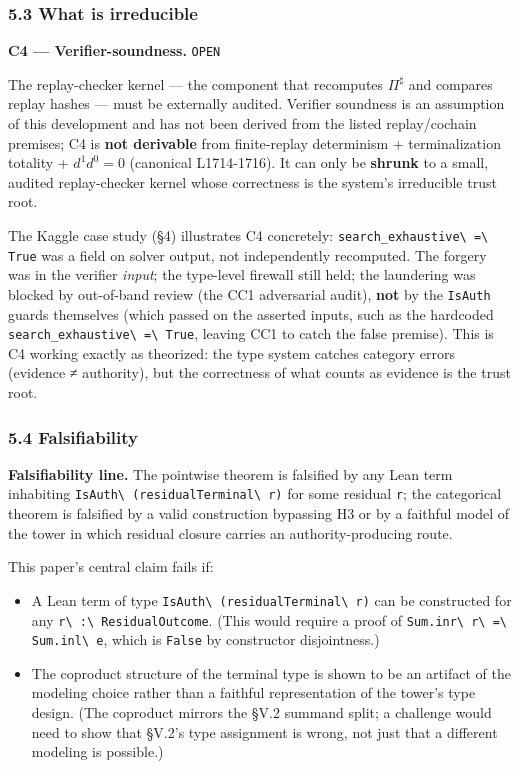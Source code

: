 \documentclass[
  10pt,
]{article}
\providecommand{\tightlist}{%
  \setlength{\itemsep}{0pt}\setlength{\parskip}{0pt}}
\providecommand{\tightlist}{%
  \setlength{\itemsep}{0pt}\setlength{\parskip}{0pt}}
\DeclareRobustCommand{\texttt}[1]{{\paperSymbolFont\nolinkurl{#1}}}
\begin{document}
\subsubsection{5.3 What is irreducible}\label{what-is-irreducible}

\textbf{C4 --- Verifier-soundness.} \texttt{OPEN}

The replay-checker kernel --- the component that recomputes \protect\hypertarget{math-E0022-0128}{}{\(\Pi^\sharp\)} and compares replay hashes --- must be externally audited. Verifier soundness is an assumption of this development and has not been derived from the listed replay/cochain premises; C4 is \textbf{not derivable} from finite-replay determinism + terminalization totality + \protect\hypertarget{math-E0085-0129}{}{\(d^1 d^0 = 0\)} (canonical L1714-1716). It can only be \textbf{shrunk} to a small, audited replay-checker kernel whose correctness is the system's irreducible trust root.

The Kaggle case study (§4) illustrates C4 concretely: \texttt{search\_exhaustive\ =\ True} was a field on solver output, not independently recomputed. The forgery was in the verifier \emph{input}; the type-level firewall still held; the laundering was blocked by out-of-band review (the CC1 adversarial audit), \textbf{not} by the \texttt{IsAuth} guards themselves (which passed on the asserted inputs, such as the hardcoded \texttt{search\_exhaustive\ =\ True}, leaving CC1 to catch the false premise). This is C4 working exactly as theorized: the type system catches category errors (evidence ≠ authority), but the correctness of what counts as evidence is the trust root.

\subsubsection{5.4 Falsifiability}\label{falsifiability}

\textbf{Falsifiability line.} The pointwise theorem is falsified by any Lean term inhabiting \texttt{IsAuth\ (residualTerminal\ r)} for some residual \texttt{r}; the categorical theorem is falsified by a valid construction bypassing H3 or by a faithful model of the tower in which residual closure carries an authority-producing route.

This paper's central claim fails if:

\begin{itemize}
\tightlist
\item
  A Lean term of type \texttt{IsAuth\ (residualTerminal\ r)} can be constructed for any \texttt{r\ :\ ResidualOutcome}. (This would require a proof of \texttt{Sum.inr\ r\ =\ Sum.inl\ e}, which is \texttt{False} by constructor disjointness.)
\item
  The coproduct structure of the terminal type is shown to be an artifact of the modeling choice rather than a faithful representation of the tower's type design. (The coproduct mirrors the §V.2 summand split; a challenge would need to show that §V.2's type assignment is wrong, not just that a different modeling is possible.)
\end{itemize}
\end{document}
